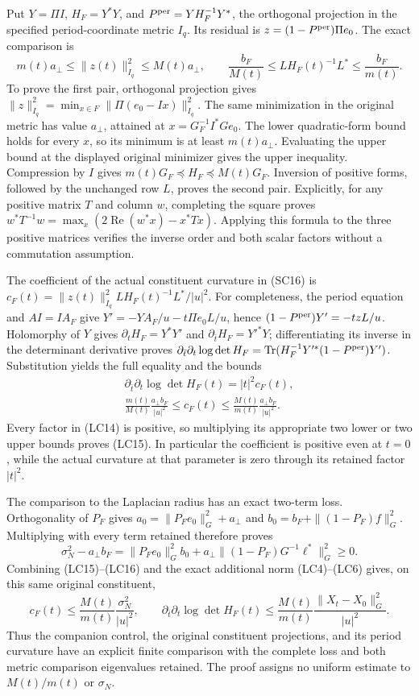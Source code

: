 \documentclass{article}
\begin{document}
Put $Y=\Pi I$, $H_F=Y^*Y$, and
$P^{\rm per}=YH_F^{-1}Y^*$, the orthogonal projection in the
specified period-coordinate metric $I_q$. Its residual is
$z=(1-P^{\rm per})\Pi e_0$. The exact comparison is
\[
 \boxed{m(t)a_\perp\le\|z(t)\|_{I_q}^2\le M(t)a_\perp,
 \qquad
 \frac{b_F}{M(t)}\le L H_F(t)^{-1}L^*
                         \le\frac{b_F}{m(t)}.}
 \tag{LC14}
\]
To prove the first pair, orthogonal projection gives
$\|z\|_{I_q}^2=\min_{x\in F}\|\Pi(e_0-Ix)\|_{I_q}^2$.
The same minimization in the original metric has value
$a_\perp$, attained at $x=G_F^{-1}I^*Ge_0$.
The lower quadratic-form bound holds for every $x$, so its minimum
is at least $m(t)a_\perp$. Evaluating the upper bound at the
displayed original minimizer gives the upper inequality.
Compression by $I$ gives $m(t)G_F\preceq H_F\preceq M(t)G_F$.
Inversion of positive forms, followed by the unchanged row $L$,
proves the second pair. Explicitly, for any positive matrix $T$
and column $w$, completing the square proves
$w^*T^{-1}w=\max_x(2\operatorname{Re}(w^*x)-x^*Tx)$.
Applying this formula to the three positive matrices verifies the
inverse order and both scalar factors without a commutation assumption.

The coefficient of the actual constituent curvature in (SC16) is
$c_F(t)=\|z(t)\|_{I_q}^2 L H_F(t)^{-1}L^*/|u|^2$.
For completeness, the period equation and $AI=IA_F$ give
$Y'=-YA_F/u-t\Pi e_0L/u$, hence
$(1-P^{\rm per})Y'=-tzL/u$.
Holomorphy of $Y$ gives $\partial_tH_F=Y^*Y'$ and
$\partial_{\bar t}H_F=Y'^*Y$; differentiating its inverse in
the determinant derivative proves
$\partial_{\bar t}\partial_t\log\det H_F
=\operatorname{Tr}(H_F^{-1}Y'^*(1-P^{\rm per})Y')$.
Substitution yields the full equality and the bounds
\[
\begin{gathered}
 \partial_{\bar t}\partial_t\log\det H_F(t)=|t|^2c_F(t),\\
 \boxed{\frac{m(t)}{M(t)}\frac{a_\perp b_F}{|u|^2}
       \le c_F(t)\le
       \frac{M(t)}{m(t)}\frac{a_\perp b_F}{|u|^2}.}
\end{gathered}\tag{LC15}
\]
Every factor in (LC14) is positive, so multiplying its appropriate
two lower or two upper bounds proves (LC15). In particular the
coefficient is positive even at $t=0$, while the actual curvature
at that parameter is zero through its retained factor $|t|^2$.

The comparison to the Laplacian radius has an exact two-term loss.
Orthogonality of $P_F$ gives
$a_0=\|P_Fe_0\|_G^2+a_\perp$ and
$b_0=b_F+\|(1-P_F)f\|_G^2$. Multiplying with every term
retained therefore proves
\[
 \boxed{\sigma_N^2-a_\perp b_F
  =\|P_Fe_0\|_G^2 b_0
      +a_\perp\|(1-P_F)G^{-1}\ell^*\|_G^2\ge0.}
 \tag{LC16}
\]
Combining (LC15)--(LC16) and the exact additional norm (LC4)--(LC6)
gives, on this same original constituent,
\[
 c_F(t)\le\frac{M(t)}{m(t)}\frac{\sigma_N^2}{|u|^2},\qquad
 \partial_{\bar t}\partial_t\log\det H_F(t)
 \le\frac{M(t)}{m(t)}
           \frac{\|X_t-X_0\|_G^2}{|u|^2}.
\]
Thus the companion control, the original constituent projections,
and its period curvature have an explicit finite comparison with
the complete loss and both metric comparison eigenvalues retained.
The proof assigns no uniform estimate to $M(t)/m(t)$ or $\sigma_N$.
\end{document}
